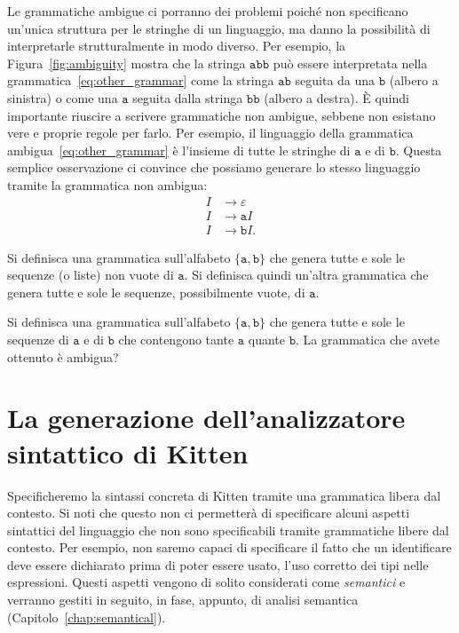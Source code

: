 Le grammatiche ambigue ci porranno dei problemi poich\'e non specificano
un'unica struttura per le stringhe di un linguaggio, ma danno la
possibilit\`a di interpretarle strutturalmente in modo diverso. Per esempio,
la Figura~\ref{fig:ambiguity} mostra che la stringa $\mathtt{abb}$ pu\`o
essere interpretata nella grammatica~\eqref{eq:other_grammar}
come la stringa $\mathtt{ab}$ seguita da una
$\mathtt{b}$ (albero a sinistra)
o come una $\mathtt{a}$ seguita dalla stringa $\mathtt{bb}$ (albero a destra). 
\`E quindi importante riuscire a scrivere grammatiche non ambigue, sebbene
non esistano vere e proprie regole per farlo. Per esempio, il linguaggio
della grammatica ambigua~\eqref{eq:other_grammar}
\`e l'insieme di tutte le stringhe di
$\mathtt{a}$ e di $\mathtt{b}$. Questa semplice osservazione ci
convince che possiamo generare lo stesso linguaggio tramite
la grammatica non ambigua:
%
\begin{align*}
  I&\to\varepsilon\\
  I&\to\mathtt{a}I\\
  I&\to\mathtt{b}I.
\end{align*}
%
\begin{exercise}\label{ex:lists}
Si definisca una grammatica sull'alfabeto $\{\mathtt{a},\mathtt{b}\}$ che
genera tutte e sole le sequenze (o liste) non vuote di $\mathtt{a}$.
Si definisca quindi un'altra grammatica che genera tutte e sole le sequenze,
possibilmente vuote, di $\mathtt{a}$.
\end{exercise}
%
\begin{exercise}\label{ex:as_many_as}
Si definisca una grammatica sull'alfabeto $\{\mathtt{a},\mathtt{b}\}$ che
genera tutte e sole le sequenze di $\mathtt{a}$ e di $\mathtt{b}$ che
contengono tante $\mathtt{a}$ quante $\mathtt{b}$. La grammatica che
avete ottenuto \`e ambigua?
\end{exercise}
%
\section{La generazione dell'analizzatore sintattico di Kitten}
  \label{sec:java_cup}
%
Specificheremo la sintassi concreta di Kitten tramite una grammatica
libera dal contesto. Si noti che questo non ci permetter\`a
di specificare alcuni
aspetti sintattici del linguaggio che non sono specificabili tramite
grammatiche libere dal contesto. Per esempio, non saremo capaci di specificare
il fatto che un identificare deve essere dichiarato prima di poter
essere usato, \nec l'uso corretto dei tipi nelle espressioni. Questi aspetti
vengono di solito considerati come \emph{semantici} e verranno
gestiti in seguito, in fase,
appunto, di analisi semantica (Capitolo~\ref{chap:semantical}).

